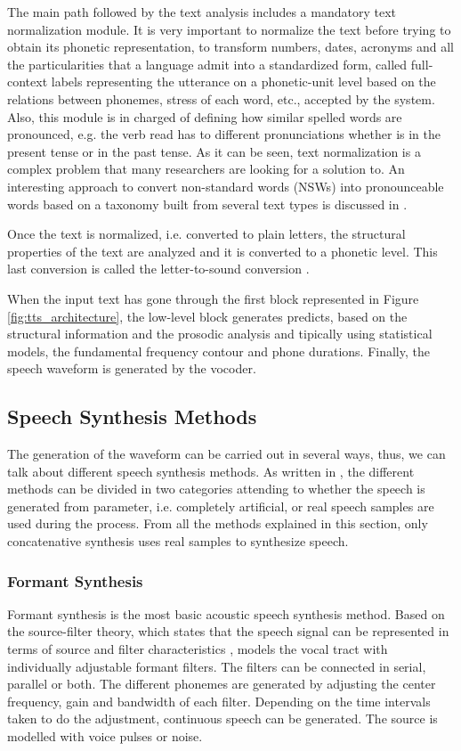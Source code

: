 The main path followed by the text analysis includes a mandatory text normalization module. It is very important to normalize the text before trying to obtain its phonetic representation, to transform numbers, dates, acronyms and all the particularities that a language admit into a standardized form, called full-context labels representing the utterance on a phonetic-unit level based on the relations between phonemes, stress of each word, etc., accepted by the system. Also, this module is in charged of defining how similar spelled words are pronounced, e.g. the verb read has to different pronunciations whether is in the present tense or in the past tense. As it can be seen, text normalization is a complex problem that many researchers are looking for a solution to. An interesting approach to convert non-standard words (NSWs) into pronounceable words based on a taxonomy built from several text types is discussed in \cite{Sproat2001}.

Once the text is normalized, i.e. converted to plain letters, the structural properties of the text are analyzed and it is converted to a phonetic level. This last conversion is called the letter-to-sound conversion \cite{Pickett1999}. 

When the input text has gone through the first block represented in Figure \ref{fig:tts_architecture}, the low-level block generates predicts, based on the structural information and the prosodic analysis and tipically using statistical models, the fundamental frequency contour and phone durations. Finally, the speech waveform is generated by the vocoder. 

\subsection{Speech Synthesis Methods}
\label{speech_synthesis_systems_methods}
The generation of the waveform can be carried out in several ways, thus, we can talk about different speech synthesis methods. As written in \cite{TuomoMSc}, the different methods can be divided in two categories attending to whether the speech is generated from parameter, i.e. completely artificial, or real speech samples are used during the process. From all the methods explained in this section, only concatenative synthesis uses real samples to synthesize speech.

\subsubsection{Formant Synthesis}
\label{formant_speech_synthesis}
Formant synthesis is the most basic acoustic speech synthesis method. Based on the source-filter theory, which states that the speech signal can be represented in terms of source and filter characteristics \cite{Fant1970}, models the vocal tract with individually adjustable formant filters. The filters can be connected in serial, parallel or both. The different phonemes are generated by adjusting the center frequency, gain and bandwidth of each filter. Depending on the time intervals taken to do the adjustment, continuous speech can be generated. The source is modelled with voice pulses or noise.

